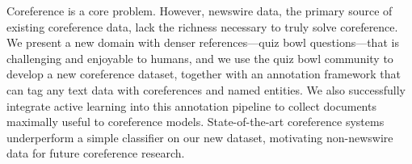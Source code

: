   Coreference is a core  problem.  However, newswire data, the primary
  source of existing coreference data, lack the richness necessary to truly
  solve coreference. We present a new domain with denser references---quiz bowl
  questions---that is challenging and enjoyable to humans, and we use the quiz
  bowl community to develop a new coreference dataset, together with an
  annotation framework that can tag any text data with coreferences and named
  entities. We also successfully integrate active learning into this annotation
  pipeline to collect documents maximally useful to coreference
  models. State-of-the-art coreference systems underperform a simple classifier
  on our new dataset, motivating non-newswire data for future
  coreference research.
